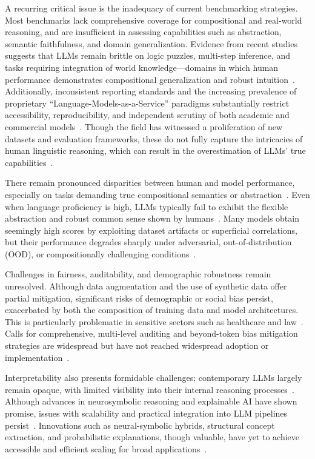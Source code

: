 A recurring critical issue is the inadequacy of current benchmarking strategies. Most benchmarks lack comprehensive coverage for compositional and real-world reasoning, and are insufficient in assessing capabilities such as abstraction, semantic faithfulness, and domain generalization. Evidence from recent studies suggests that LLMs remain brittle on logic puzzles, multi-step inference, and tasks requiring integration of world knowledge---domains in which human performance demonstrates compositional generalization and robust intuition~\cite{ref17,ref18,ref19,ref31,ref32,ref34,ref79,ref98}. Additionally, inconsistent reporting standards and the increasing prevalence of proprietary ``Language-Models-as-a-Service'' paradigms substantially restrict accessibility, reproducibility, and independent scrutiny of both academic and commercial models~\cite{ref13,ref34,ref47,ref52,ref106,ref107,ref108}. Though the field has witnessed a proliferation of new datasets and evaluation frameworks, these do not fully capture the intricacies of human linguistic reasoning, which can result in the overestimation of LLMs' true capabilities~\cite{ref44,ref77,ref79,ref98,ref99,ref102,ref103}.

There remain pronounced disparities between human and model performance, especially on tasks demanding true compositional semantics or abstraction~\cite{ref31,ref32,ref44,ref98,ref99}. Even when language proficiency is high, LLMs typically fail to exhibit the flexible abstraction and robust common sense shown by humans~\cite{ref44,ref99}. Many models obtain seemingly high scores by exploiting dataset artifacts or superficial correlations, but their performance degrades sharply under adversarial, out-of-distribution (OOD), or compositionally challenging conditions~\cite{ref55,ref77,ref98}.

Challenges in fairness, auditability, and demographic robustness remain unresolved. Although data augmentation and the use of synthetic data offer partial mitigation, significant risks of demographic or social bias persist, exacerbated by both the composition of training data and model architectures. This is particularly problematic in sensitive sectors such as healthcare and law~\cite{ref2,ref15,ref18,ref19,ref49,ref50,ref55,ref90,ref91}. Calls for comprehensive, multi-level auditing and beyond-token bias mitigation strategies are widespread but have not reached widespread adoption or implementation~\cite{ref15,ref18,ref49,ref89,ref90}.

Interpretability also presents formidable challenges; contemporary LLMs largely remain opaque, with limited visibility into their internal reasoning processes~\cite{ref24,ref34,ref37,ref38,ref41,ref43,ref48,ref54,ref89,ref92,ref93,ref94}. Although advances in neurosymbolic reasoning and explainable AI have shown promise, issues with scalability and practical integration into LLM pipelines persist~\cite{ref38,ref48,ref54,ref89,ref92,ref93,ref94}. Innovations such as neural-symbolic hybrids, structural concept extraction, and probabilistic explanations, though valuable, have yet to achieve accessible and efficient scaling for broad applications~\cite{ref43,ref48,ref54,ref92,ref93,ref94}.

